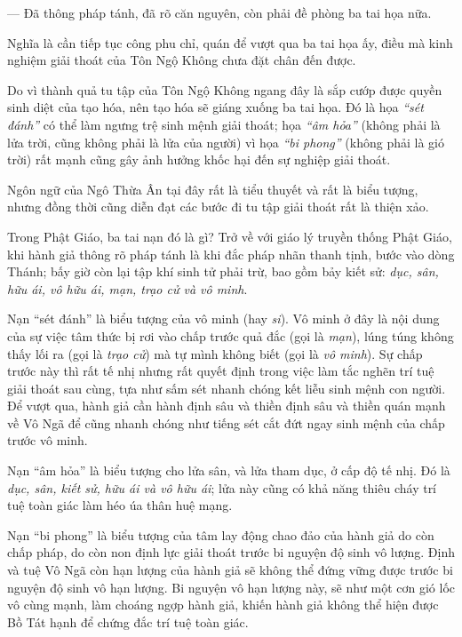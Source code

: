 — Đã thông pháp tánh, đã rõ căn nguyên, còn phải đề phòng ba tai họa nữa.

Nghĩa là cần tiếp tục công phu chỉ, quán để vượt qua ba tai họa ấy, điều mà kinh nghiệm giải thoát của Tôn Ngộ Không chưa đặt chân đến được.

Do vì thành quả tu tập của Tôn Ngộ Không ngang đây là sắp cướp được quyền sinh diệt của tạo hóa, nên tạo hóa sẽ giáng xuống ba tai họa. Đó là họa \emph{``sét đánh''} có thể làm ngưng trệ sinh mệnh giải thoát; họa \emph{``âm hỏa''} (không phải là lửa trời, cũng không phải là lửa của người) vì họa \emph{``bi phong''} (không phải là gió trời) rất mạnh cũng gây ảnh hưởng khốc hại đến sự nghiệp giải thoát.

Ngôn ngữ của Ngô Thừa Ân tại đây rất là tiểu thuyết và rất là biểu tượng, nhưng đồng thời cũng diễn đạt các bước đi tu tập giải thoát rất là thiện xảo.

Trong Phật Giáo, ba tai nạn đó là gì? Trở về với giáo lý truyền thống Phật Giáo, khi hành giả thông rõ pháp tánh là khi đắc pháp nhãn thanh tịnh, bước vào dòng Thánh; bấy giờ còn lại tập khí sinh tử phải trừ, bao gồm bảy kiết sử: \emph{dục, sân, hữu ái, vô hữu ái, mạn, trạo cử và vô minh}.

Nạn ``sét đánh'' là biểu tượng của vô minh (hay \emph{si}). Vô minh ở đây là nội dung của sự việc tâm thức bị rơi vào chấp trước quả đắc (gọi là \emph{mạn}), lúng túng không thấy lối ra (gọi là \emph{trạo cử}) mà tự mình không biết (gọi là \emph{vô minh}). Sự chấp trước này thì rất tế nhị nhưng rất quyết định trong việc làm tắc nghẽn trí tuệ giải thoát sau cùng, tựa như sấm sét nhanh chóng kết liễu sinh mệnh con người. Để vượt qua, hành giả cần hành định sâu và thiền định sâu và thiền quán mạnh về Vô Ngã để cũng nhanh chóng như tiếng sét cắt đứt ngay sinh mệnh của chấp trước vô minh.

Nạn ``âm hỏa'' là biểu tượng cho lửa sân, và lửa tham dục, ở cấp độ tế nhị. Đó là \emph{dục, sân, kiết sử, hữu ái và vô hữu ái}; lửa này cũng có khả năng thiêu cháy trí tuệ toàn giác làm héo úa thân huệ mạng.

Nạn ``bi phong'' là biểu tượng của tâm lay động chao đảo của hành giả do còn chấp pháp, do còn non định lực giải thoát trước bi nguyện độ sinh vô lượng. Định và tuệ Vô Ngã còn hạn lượng của hành giả sẽ không thể đứng vững được trước bi nguyện độ sinh vô hạn lượng. Bi nguyện vô hạn lượng này, sẽ như một cơn gió lốc vô cùng mạnh, làm choáng ngợp hành giả, khiến hành giả không thể hiện được Bồ Tát hạnh để chứng đắc trí tuệ toàn giác.


